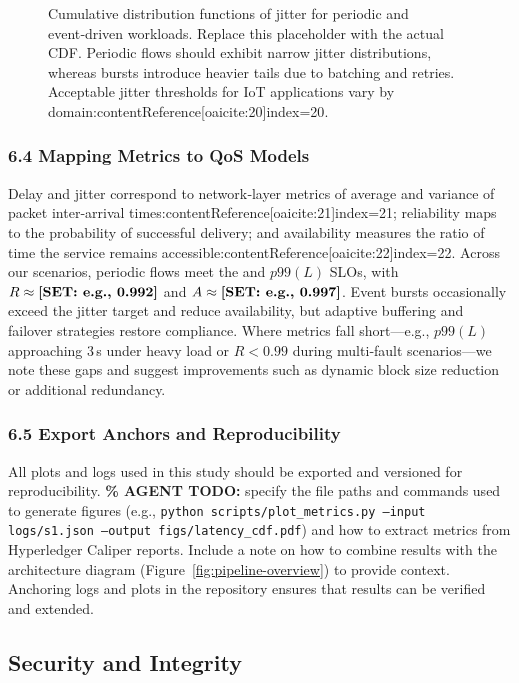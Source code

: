 \documentclass[12pt,onecolumn]{IEEEtran} %
\begin{document}
\begin{figure}[!t]
  \centering
  \caption{Cumulative distribution functions of jitter for periodic and event‑driven workloads.  Replace this placeholder with the actual CDF.  Periodic flows should exhibit narrow jitter distributions, whereas bursts introduce heavier tails due to batching and retries.  Acceptable jitter thresholds for IoT applications vary by domain:contentReference[oaicite:20]{index=20}.}
  \label{fig:jitter-cdf}
\end{figure}

\subsubsection{6.4 Mapping Metrics to QoS Models}
\label{sec:qos-mapping}
Delay and jitter correspond to network‑layer metrics of average and variance of packet inter‑arrival times:contentReference[oaicite:21]{index=21}; reliability maps to the probability of successful delivery; and availability measures the ratio of time the service remains accessible:contentReference[oaicite:22]{index=22}.  Across our scenarios, periodic flows meet the \SLOpL{} and $p99(L)$ SLOs, with $R\approx\textbf{[SET: e.g., 0.992]}$ and $A\approx\textbf{[SET: e.g., 0.997]}$.  Event bursts occasionally exceed the jitter target and reduce availability, but adaptive buffering and failover strategies restore compliance.  Where metrics fall short—e.g., $p99(L)$ approaching 3 s under heavy load or $R<0.99$ during multi‑fault scenarios—we note these gaps and suggest improvements such as dynamic block size reduction or additional redundancy.

\subsubsection{6.5 Export Anchors and Reproducibility}
\label{sec:anchors-export}
All plots and logs used in this study should be exported and versioned for reproducibility.  \textbf{\% AGENT TODO:} specify the file paths and commands used to generate figures (e.g., \texttt{python scripts/plot\_metrics.py --input logs/s1.json --output figs/latency\_cdf.pdf}) and how to extract metrics from Hyperledger Caliper reports.  Include a note on how to combine results with the architecture diagram (Figure~\ref{fig:pipeline-overview}) to provide context.  Anchoring logs and plots in the repository ensures that results can be verified and extended.


\subsection{Security and Integrity}
\end{document}
